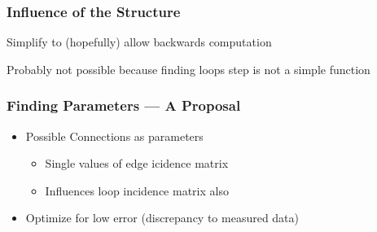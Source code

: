\documentclass{beamer}
\begin{document}
\begin{frame}
\frametitle{Influence of the Structure}
  Simplify to (hopefully) allow backwards computation

  \vspace{1em}

  \begin{figure}
  \end{figure}

  \vspace{1em}

  Probably not possible because finding loops step is not a simple function
\end{frame}

\begin{frame}
\frametitle{Finding Parameters --- A Proposal}
  \begin{itemize}
    \item Possible Connections as parameters
      \begin{itemize}
        \item Single values of edge icidence matrix
        \item Influences loop incidence matrix also
      \end{itemize}
    \item Optimize for low error (discrepancy to measured data)
  \end{itemize}
\end{frame}
\end{document}
